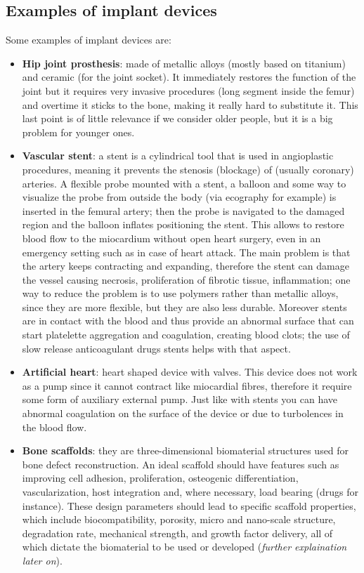     \subsection{Examples of implant devices}
    Some examples of implant devices are:
    \begin{itemize}
      \item \textbf{Hip joint prosthesis}: made of metallic alloys (mostly based on titanium) and ceramic (for the joint socket). It immediately restores the function of the joint but it requires very invasive procedures (long segment inside the femur) and overtime it sticks to the bone, making it really hard to substitute it. This last point is of little relevance if we consider older people, but it is a big problem for younger ones.
      \item \textbf{Vascular stent}: a stent is a cylindrical tool that is used in angioplastic procedures, meaning it prevents the stenosis (blockage) of (usually coronary) arteries. A flexible probe mounted with a stent, a balloon and some way to visualize the probe from outside the body (via ecography for example) is inserted in the femural artery; then the probe is navigated to the damaged region and the balloon inflates positioning the stent. This allows to restore blood flow to the miocardium without open heart surgery, even in an emergency setting such as in case of heart attack. The main problem is that the artery keeps contracting and expanding, therefore the stent can damage the vessel causing necrosis, proliferation of fibrotic tissue, inflammation; one way to reduce the problem is to use polymers rather than metallic alloys, since they are more flexible, but they are also less durable. Moreover stents are in contact with the blood and thus provide an abnormal surface that can start platelette aggregation and coagulation, creating blood clots; the use of slow release anticoagulant drugs stents helps with that aspect. 
      \item \textbf{Artificial heart}: heart shaped device with valves. This device does not work as a pump since it cannot contract like miocardial fibres, therefore it require some form of auxiliary external pump. Just like with stents you can have abnormal coagulation on the surface of the device or due to turbolences in the blood flow.
      \item \textbf{Bone scaffolds}: they are three-dimensional biomaterial structures used for bone defect reconstruction. An ideal scaffold should have features such as improving cell adhesion, proliferation, osteogenic differentiation, vascularization, host integration and, where necessary, load bearing (drugs for instance). These design parameters should lead to specific scaffold properties, which include biocompatibility, porosity, micro and nano-scale structure, degradation rate, mechanical strength, and growth factor delivery, all of which dictate the biomaterial to be used or developed (\textit{further explaination later on}).   
    \end{itemize}

